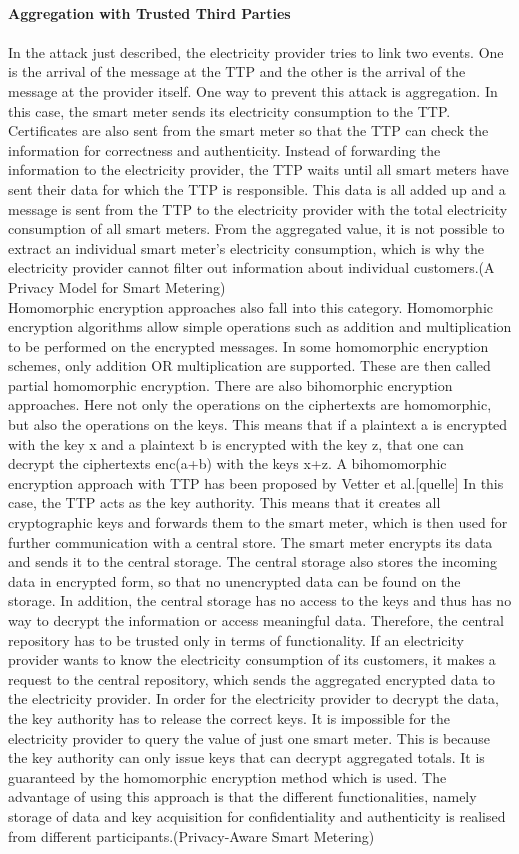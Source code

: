 \\
\textbf{Aggregation with Trusted Third Parties}
\\
\\
In the attack just described, the electricity provider tries to link two events. One is the arrival of the message at the TTP and the other is the arrival of the message at the provider itself. One way to prevent this attack is aggregation. In this case, the smart meter sends its electricity consumption to the TTP. Certificates are also sent from the smart meter so that the TTP can check the information for correctness and authenticity. Instead of forwarding the information to the electricity provider, the TTP waits until all smart meters have sent their data for which the TTP is responsible. This data is all added up and a message is sent from the TTP to the electricity provider with the total electricity consumption of all smart meters. From the aggregated value, it is not possible to extract an individual smart meter's electricity consumption, which is why the electricity provider cannot filter out information about individual customers.(A Privacy Model for Smart Metering)\\
Homomorphic encryption approaches also fall into this category. Homomorphic encryption algorithms allow simple operations such as addition and multiplication to be performed on the encrypted messages.  In some homomorphic encryption schemes, only addition OR multiplication are supported. These are then called partial homomorphic encryption.
There are also bihomorphic encryption approaches. Here not only the operations on the ciphertexts are homomorphic, but also the operations on the keys. This means that if a plaintext a is encrypted with the key x and a plaintext b is encrypted with the key z, that one can decrypt the ciphertexts enc(a+b) with the keys x+z. A bihomomorphic encryption approach with TTP has been proposed by Vetter et al.[quelle] In this case, the TTP acts as the key authority. This means that it creates all cryptographic keys and forwards them to the smart meter, which is then used for further communication with a central store. The smart meter encrypts its data and sends it to the central storage. The central storage also stores the incoming data in encrypted form, so that no unencrypted data can be found on the storage. In addition, the central storage has no access to the keys and thus has no way to decrypt the information or access meaningful data.
Therefore, the central repository has to be trusted only in terms of functionality. If an electricity provider wants to know the electricity consumption of its customers, it makes a request to the central repository, which sends the aggregated encrypted data to the electricity provider. In order for the electricity provider to decrypt the data, the key authority has to release the correct keys. It is impossible for the electricity provider to query the value of just one smart meter. This is because the key authority can only issue keys that can decrypt aggregated totals. It is guaranteed by the homomorphic encryption method which is used. The advantage of using this approach is that the different functionalities, namely storage of data and key acquisition for confidentiality and authenticity is realised from different participants.(Privacy-Aware Smart Metering)
